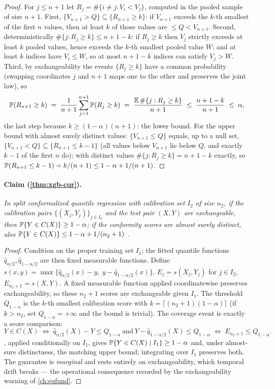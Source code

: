\begin{proof}
For $j \le n+1$ let $R_j = \#\{i \ne j : V_i < V_j\}$, computed in the pooled sample of size $n+1$.
First, $\{V_{n+1} > Q\} \subseteq \{R_{n+1} \ge k\}$: if $V_{n+1}$ exceeds the $k$-th smallest of the
first $n$ values, then at least $k$ of those values are $\le Q < V_{n+1}$. Second, deterministically
$\#\{j : R_j \ge k\} \le n+1-k$: if $R_j \ge k$ then $V_j$ strictly exceeds at least $k$ pooled values,
hence exceeds the $k$-th smallest pooled value $W$; and at least $k$ indices have $V_i \le W$, so at
most $n+1-k$ indices can satisfy $V_j > W$. Third, by exchangeability the events $\{R_j \ge k\}$ have a
common probability (swapping coordinates $j$ and $n+1$ maps one to the other and preserves the joint
law), so
\[
\mathbb{P}(R_{n+1} \ge k) \;=\; \frac{1}{n+1} \sum_{j=1}^{n+1} \mathbb{P}(R_j \ge k)
\;=\; \frac{\mathbb{E}\,\#\{j : R_j \ge k\}}{n+1} \;\le\; \frac{n+1-k}{n+1} \;\le\; \alpha ,
\]
the last step because $k \ge (1-\alpha)(n+1)$: the lower bound. For the upper bound with almost surely
distinct values: $\{V_{n+1} \le Q\}$ equals, up to a null set, $\{V_{n+1} < Q\} \subseteq \{R_{n+1}
\le k-1\}$ (all values below $V_{n+1}$ lie below $Q$, and exactly $k-1$ of the first $n$ do); with
distinct values $\#\{j : R_j \ge k\} = n+1-k$ exactly, so $\mathbb{P}(R_{n+1} \le k-1) = k/(n+1) \le
1-\alpha+1/(n+1)$.
\end{proof}
\paragraph{Claim (\cref{thm:xgb-cqr}).}
\emph{In split conformalized quantile regression with calibration set $I_2$ of size $n_2$, if the
calibration pairs $\{(X_j, Y_j)\}_{j \in I_2}$ and the test pair $(X, Y)$ are exchangeable, then
$\mathbb{P}\{Y \in C(X)\} \ge 1 - \alpha$; if the conformity scores are almost surely distinct, also
$\mathbb{P}\{Y \in C(X)\} \le 1 - \alpha + 1/(n_2+1)$ \citep{romano2019}.}
\begin{proof}
Condition on the proper training set $I_1$; the fitted quantile functions $\hat q_{\alpha/2}, \hat
q_{1-\alpha/2}$ are then fixed measurable functions. Define $s(x,y) = \max\{\hat q_{\alpha/2}(x) -
y,\; y - \hat q_{1-\alpha/2}(x)\}$, $E_j = s(X_j, Y_j)$ for $j \in I_2$, $E_{n_2+1} = s(X, Y)$. A
fixed measurable function applied coordinatewise preserves exchangeability, so these $n_2 + 1$ scores
are exchangeable given $I_1$. The threshold $Q_{1-\alpha}$ is the $k$-th smallest calibration score
with $k = \lceil (n_2+1)(1-\alpha) \rceil$ (if $k > n_2$, set $Q_{1-\alpha} = +\infty$ and the bound
is trivial). The coverage event is exactly a score comparison:
\[
Y \in C(X)
\;\Longleftrightarrow\;
\hat q_{\alpha/2}(X) - Y \le Q_{1-\alpha} \ \text{and}\ Y - \hat q_{1-\alpha/2}(X) \le Q_{1-\alpha}
\;\Longleftrightarrow\;
E_{n_2+1} \le Q_{1-\alpha}.
\]
, applied conditionally on $I_1$, gives $\mathbb{P}\{Y \in C(X) \mid I_1\} \ge 1-\alpha$
and, under almost-sure distinctness, the matching upper bound; integrating over $I_1$ preserves both.
The guarantee is \emph{marginal} and rests entirely on exchangeability, which temporal drift breaks
--- the operational consequence recorded by the exchangeability warning of \cref{ch:eufund}.
\end{proof}
